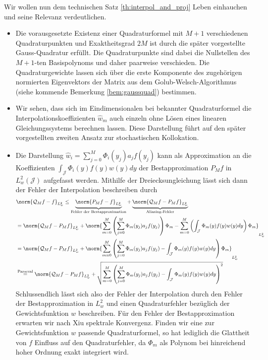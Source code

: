 \begin{mathbem}
Wir wollen nun dem technischen Satz \ref{th:interpol_and_proj} Leben einhauchen und seine Relevanz verdeutlichen.
\begin{itemize}
\item
Die vorausgesetzte Existenz einer Quadraturformel mit $M+1$ verschiedenen Quadraturpunkten und Exaktheitsgrad $2M$ ist durch die später vorgestellte Gauss-Quadratur erfüllt. Die Quadraturpunkte sind dabei die Nullstellen des $M+1$-ten Basispolynoms und daher paarweise verschieden. Die Quadraturgewichte lassen sich über die erste Komponente des zugehörigen normierten Eigenvektors der Matrix aus dem Golub-Welsch-Algorithmus (siehe kommende Bemerkung \ref{bem:gaussquad}) bestimmen.
\item
Wir sehen, dass sich im Eindimensionalen bei bekannter Quadraturformel die Interpolationskoeffizienten $\hat{w}_m$ auch einzeln ohne Lösen eines linearen Gleichungssystems berechnen lassen. Diese Darstellung führt auf den später vorgestellten zweiten Ansatz zur stochastischen Kollokation.
\item
Die Darstellung $\hat{w}_i=\sum_{j=0}^M\Phi_i(y_j)a_jf(y_j)$ kann als Approximation an die Koeffizienten $\int_\mathcal{J} \Phi_i(y)f(y)w(y)dy$ der Bestapproximation $P_Mf$ in $L_w^2(\mathcal{J})$ aufgefasst werden. Mithilfe der Dreiecksungleichung lässt sich dann der Fehler der Interpolation beschreiben durch
\begin{align*}
&\norm{\mathcal{Q}_Mf-f}_{L_w^2}\le \underbrace{\norm{P_Mf-f}_{L_w^2}}_{\text{Fehler der Bestapproximation}}+\underbrace{\norm{\mathcal{Q}_Mf-P_Mf}_{L_w^2}}_{\text{Aliasing-Fehler}}\\
&=\norm{\mathcal{Q}_Mf-P_Mf}_{L_w^2}+\norm{\sum_{m=0}^M\left(\sum_{j=0}^M\Phi_m(y_j)a_jf(y_j)\right)\Phi_m-\sum_{m=0}^M\left(\int_\mathcal{J}\Phi_m(y)f(y)w(y)dy\right)\Phi_m}_{L_w^2}\\
&=\norm{\mathcal{Q}_Mf-P_Mf}_{L_w^2}+\norm{\sum_{m=0}^M\left(\sum_{j=0}^M\Phi_m(y_j)a_jf(y_j)-\int_\mathcal{J}\Phi_m(y)f(y)w(y)dy\right)\Phi_m}_{L_w^2}\\
&\stackrel{\text{Parseval}}{=}\norm{\mathcal{Q}_Mf-P_Mf}_{L_w^2}+\sqrt{\sum_{m=0}^M\left(\sum_{j=0}^M\Phi_m(y_j)a_jf(y_j)-\int_\mathcal{J}\Phi_m(y)f(y)w(y)dy\right)^2}
\end{align*}
Schlussendlich lässt sich also der Fehler der Interpolation durch den Fehler der Bestapproximation in $L_w^2$ und einen Quadraturfehler bezüglich der Gewichtsfunktion $w$ beschreiben. Für den Fehler der Bestapproximation erwarten wir nach Xiu spektrale Konvergenz. Finden wir eine zur Gewichtsfunktion $w$ passende Quadraturformel, so hat lediglich die Glattheit von $f$ Einfluss auf den Quadraturfehler, da $\Phi_m$ als Polynom bei hinreichend hoher Ordnung exakt integriert wird.
\end{itemize}
\end{mathbem}
